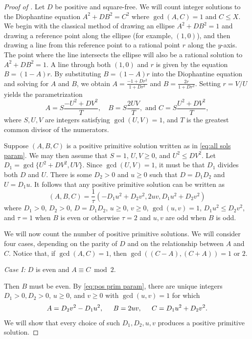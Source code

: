 \documentclass[12pt]{amsart}
\theoremstyle{plain}
\begin{document}
\begin{proof}[Proof of ]
Let $D$ be positive and square-free. We will count integer solutions to the Diophantine equation $A^2 + DB^2 = C^2$ where $\gcd(A, C) = 1$ and $C \leq X$. We begin with the classical method of drawing an ellipse $A^2 + DB^2 = 1$ and drawing a reference point along the ellipse (for example, $(1, 0)$), and then drawing a line from this reference point to a rational point $r$ along the $y$-axis. The point where the line intersects the ellipse will also be a rational solution to $A^2 + DB^2 = 1$. A line through both $(1,0)$ and $r$ is given by the equation $B = (1-A)r$. By substituting $B = (1-A)r$ into the Diophantine equation and solving for $A$ and $B$, we obtain $A = \frac{-1 + Dr^2}{1 + Dr^2}$ and $B = \frac{2r}{1+Dr^2}$. Setting $r=V/U$ yields the parametrization 
    \begin{equation} \label{eq:all sols param}
    A= S\frac{-U^2+DV^2}{T},\quad B=S\frac{2UV}{T}, \text{ and } C=S\frac{U^2+DV^2}{T}, \end{equation}
where $S,U,V$ are integers satisfying $\gcd(U,V)=1$, and $T$ is the greatest common divisor of the numerators.

Suppose $(A,B,C)$ is a positive primitive solution written as in \eqref{eq:all sols param}. We may then assume that $S=1$, $U,V\geq0$, and $U^2\leq DV^2$. Let $D_1=\gcd\{U^2+DV^2,UV\}$. Since $\gcd(U,V)=1$, it must be that $D_1$ divides both $D$ and $U$. There is some $D_2>0$ and $u\geq0$ such that $D=D_1D_2$ and $U=D_1u$. It follows that any positive primitive solution can be written as 
\begin{equation} \label{eq:pos prim param}
     (A,B,C)=\frac{1}{\tau}(-D_1u^2+D_2v^2,2uv,D_1u^2+D_2v^2) 
\end{equation}
where $D_1 > 0$, $D_2 >0$, $D=D_1D_2$, $u \geq 0$, $v \geq 0$, $\gcd(u, v) = 1$, $D_1u^2\leq D_2v^2$, and $\tau=1$ when $B$ is even or otherwise $\tau=2$ and $u,v$ are odd when $B$ is odd.

We will now count the number of positive primitive solutions. We will consider four cases, depending on the parity of $D$ and on the relationship between $A$ and $C$. Notice that, if $\gcd(A, C) = 1$, then $\gcd((C-A), (C+A)) = 1$ or $2$. 

\vspace{10pt}
\noindent \emph{Case I:} $D$ is even and $A\equiv C\bmod2$. 

Then $B$ must be even. 
By \eqref{eq:pos prim param}, there are unique integers $D_1 > 0, D_2 >0$, $u \geq 0$, and $v \geq 0$ with $\gcd(u, v) = 1$ for which 
\[ A = D_2 v^2 - D_1 u^2, \hspace{0.2 in} B = 2uv, \hspace{0.2 in} C = D_1u^2 + D_2v^2.\]
We will show that every choice of such $D_1, D_2, u, v$ produces a positive primitive solution.


\end{proof}
\end{document}
